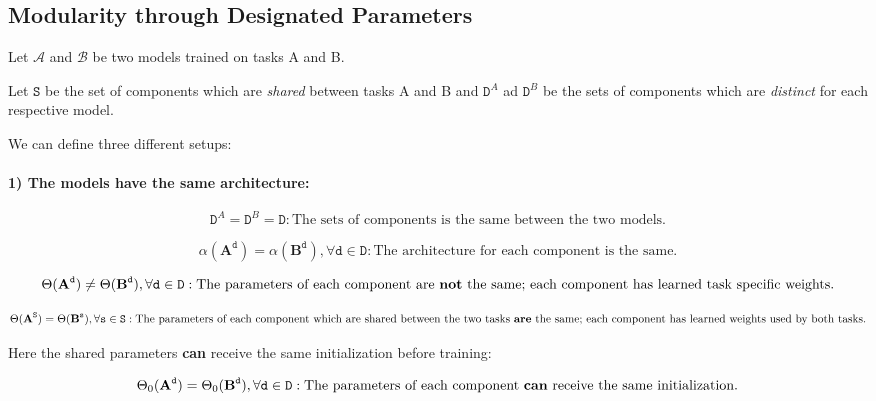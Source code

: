 \subsection{Modularity through Designated Parameters}

Let $\mathcal{A}$ and $\mathcal{B}$ be two models trained on tasks A and B.

Let $\mathtt{S}$ be the set of components which are \textit{shared} between tasks A and B and $\mathtt{D}^A$ ad $\mathtt{D}^B$ be the sets of components which are \textit{distinct} for each respective model. 

We can define three different setups:

\paragraph{1) The models have the same architecture:}

\begin{equation}
    \mathtt{D}^A = \mathtt{D}^B = \mathtt{D} : \text{The sets of components is the same between the two models.}
\end{equation}

\begin{equation}
    \alpha(\textbf{A}^\mathtt{d}) = \alpha(\textbf{B}^\mathtt{d}), \forall \mathtt{d} \in \mathtt{D} : \text{The architecture for each component is the same.}
\end{equation}
    
\begin{equation}
    \Theta(\textbf{A}^\mathtt{d}) \neq \Theta(\textbf{B}^\mathtt{d}) , \forall \mathtt{d} \in \mathtt{D} : \text{The parameters of each component are \textbf{not} the same; each component has learned task specific weights.}
\end{equation}

\begin{equation}
    \Theta(\textbf{A}^\mathtt{S}) = \Theta(\textbf{B}^\mathtt{s}) , \forall \mathtt{s} \in \mathtt{S} : \text{The parameters of each component which are shared between the two tasks  \textbf{are} the same;  each component has learned  weights used by both tasks.}
\end{equation}

Here the shared  parameters \textbf{can} receive the same initialization before training: 

\begin{equation}
    \Theta_0(\textbf{A}^\mathtt{d}) = \Theta_0(\textbf{B}^\mathtt{d}) , \forall \mathtt{d} \in \mathtt{D} : \text{The parameters of each component \textbf{can} receive the same initialization.}
\end{equation}

